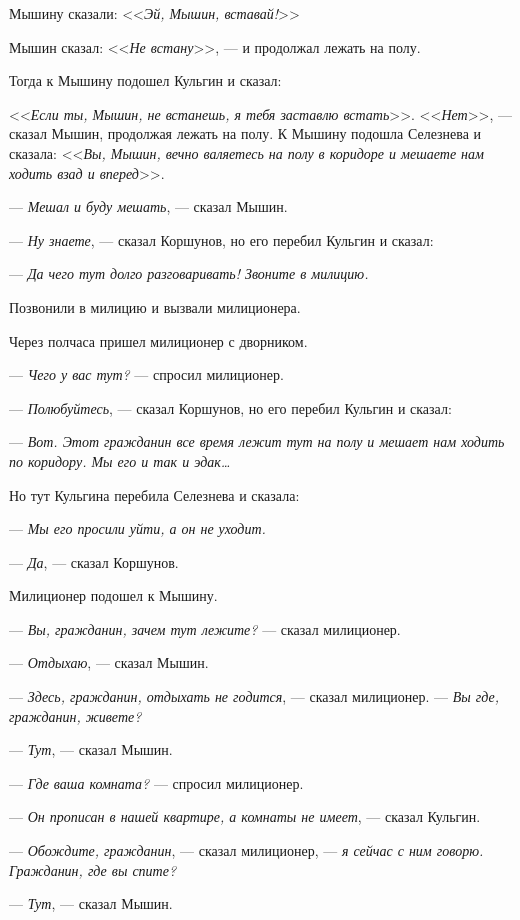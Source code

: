 Мышину сказали: <<\textit{Эй, Мышин, вставай!}>>

Мышин сказал: <<\textit{Не встану}>>, --- и продолжал лежать на полу.

Тогда к Мышину подошел Кульгин и сказал:

<<\textit{Если ты, Мышин, не встанешь, я тебя заставлю встать}>>. <<\textit{Нет}>>, --- сказал Мышин, продолжая лежать на полу. К Мышину подошла Селезнева и сказала:
<<\textit{Вы, Мышин, вечно валяетесь на полу в коридоре и мешаете нам ходить взад и вперед}>>.

--- \textit{Мешал и буду мешать}, --- сказал Мышин.

--- \textit{Ну знаете}, --- сказал Коршунов, но его перебил Кульгин и сказал:

--- \textit{Да чего тут долго разговаривать! Звоните в милицию.}

Позвонили в милицию и вызвали милиционера.

Через полчаса пришел милиционер с дворником.

--- \textit{Чего у вас тут?} --- спросил милиционер.

--- \textit{Полюбуйтесь}, --- сказал Коршунов, но его перебил Кульгин и сказал:

--- \textit{Вот. Этот гражданин все время лежит тут на полу и мешает нам ходить по коридору. Мы его и так и эдак\dots}

Но тут Кульгина перебила Селезнева и сказала:

--- \textit{Мы его просили уйти, а он не уходит.}

--- \textit{Да}, --- сказал Коршунов.

Милиционер подошел к Мышину.

--- \textit{Вы, гражданин, зачем тут лежите?} --- сказал милиционер.

--- \textit{Отдыхаю}, --- сказал Мышин.

--- \textit{Здесь, гражданин, отдыхать не годится}, --- сказал милиционер. --- \textit{Вы где, гражданин, живете?}

--- \textit{Тут}, --- сказал Мышин.

--- \textit{Где ваша комната?} --- спросил милиционер.

--- \textit{Он прописан в нашей квартире, а комнаты не имеет}, --- сказал Кульгин.

--- \textit{Обождите, гражданин}, --- сказал милиционер, --- \textit{я сейчас с ним говорю. Гражданин, где вы спите?}

--- \textit{Тут}, --- сказал Мышин.

